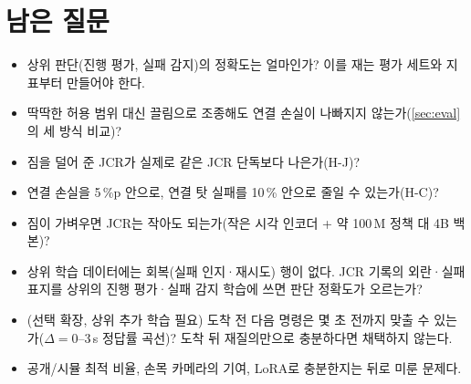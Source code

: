 \section{남은 질문}
\label{sec:questions}
\begin{itemize}
  \item 상위 판단(진행 평가, 실패 감지)의 정확도는 얼마인가? 이를 재는 평가 세트와 지표부터 만들어야 한다.
  \item 딱딱한 허용 범위 대신 끌림으로 조종해도 연결 손실이 나빠지지 않는가(\cref{sec:eval}의 세 방식 비교)?
  \item 짐을 덜어 준 JCR가 실제로 같은 JCR 단독보다 나은가(H-J)?
  \item 연결 손실을 5\,\%p 안으로, 연결 탓 실패를 10\,\% 안으로 줄일 수 있는가(H-C)?
  \item 짐이 가벼우면 JCR는 작아도 되는가(작은 시각 인코더 + 약 100\,M 정책 대 4B 백본)?
  \item 상위 학습 데이터에는 회복(실패 인지·재시도) 행이 없다. JCR 기록의 외란·실패 표지를 상위의 진행 평가·실패 감지 학습에 쓰면 판단 정확도가 오르는가?
  \item (선택 확장, 상위 추가 학습 필요) 도착 전 다음 명령은 몇 초 전까지 맞출 수 있는가($\Delta=0$--3\,s 정답률 곡선)? 도착 뒤 재질의만으로 충분하다면 채택하지 않는다.
  \item 공개/시뮬 최적 비율, 손목 카메라의 기여, LoRA로 충분한지는 뒤로 미룬 문제다.
\end{itemize}
